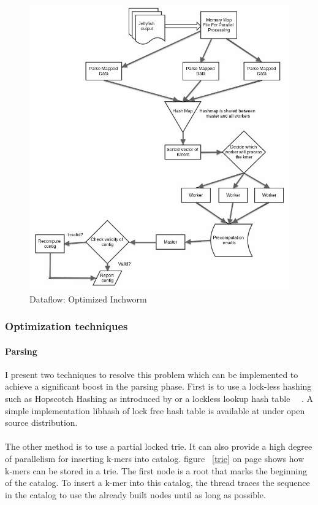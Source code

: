 \label{key}\documentclass[plainarticle, english ,zihtitle,final,hyperref,utf8]{zihpub}
\begin{document}
\begin{figure}[h]
\center
\includegraphics[scale=0.5]{Inchworm_dfd}
\caption{Dataflow: Optimized Inchworm}
\label{dfd}
\end{figure}
\subsubsection{Optimization techniques}
\paragraph{Parsing}
I present two techniques to resolve this problem which can be implemented to achieve a significant boost in the parsing phase. First is to use a lock-less hashing such as Hopscotch Hashing as introduced by \cite{hopscotch} or a lockless lookup hash table ~~\cite{tock}. A simple implementation libhash of lock free hash table is available at \cite{lockfree} under open source distribution.
\paragraph{}
The other method is to use a partial locked trie. It can also provide a high degree of parallelism for inserting k-mers into catalog. figure ~\ref{trie} on page \pageref{trie} shows how k-mers can be stored in a trie. The first node is a root that marks the beginning of the catalog. To insert a k-mer into this catalog, the thread traces the sequence in the catalog to use the already built nodes until as long as possible. 
\end{document}
